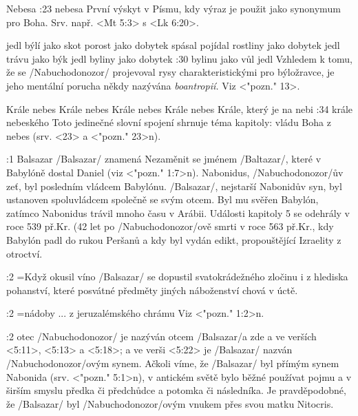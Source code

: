     {}   %
    {}   %
    {Nebesa}   %
    {}   %
    {}   %
:23 {nebesa}  První výskyt v Písmu, kdy výraz  je použit jako synonymum pro Boha. Srv. např.  <Mt 5:3> s <Lk 6:20>.

    {jedl býlí jako skot}   %
    {porost jako dobytek spásal}   %
    {pojídal rostliny jako dobytek}   %
    {jedl trávu jako býk}   %
    {jedl byliny jako dobytek}   %
:30 {bylinu jako vůl jedl}
     Vzhledem k tomu, že  se \x/Nabuchodonozor/ projevoval rysy charakteristickými pro býložravce, je jeho mentální porucha někdy nazývána {\em boantropií.} Viz <"pozn." 13>.

    {Krále nebes}   %
    {Krále nebes}   %
    {Krále nebes}   %
    {Krále nebes}   %
    {Krále, který je na nebi}   %
:34 {krále nebeského} Toto jedinečné slovní spojení shrnuje téma kapitoly: vládu Boha z nebes (srv. <23> a <"pozn." 23>n). 


:1 {Balsazar}
     \x/Balsazar/ znamená  
     Nezaměnit se jménem \x/Baltazar/, které v Babylóně dostal Daniel (viz <"pozn." 1:7>n). 
     Nabonidus, \x/Nabuchodonozor/ův zeť, byl posledním vládcem Babylónu. 
     \x/Balsazar/, nejstarší Nabonidův syn, byl ustanoven spoluvládcem společně se svým otcem.
     Byl mu svěřen Babylón, zatímco Nabonidus trávil mnoho času v Arábii.
     Události kapitoly 5 se odehrály v roce 539 př.Kr. (42 let po \x/Nabuchodonozor/ově
     smrti v roce 563 př.Kr., kdy Babylón padl do rukou Peršanů a kdy byl vydán
     edikt, propouštějící Izraelity z otroctví. 
     
     
:2 {}={Když okusil víno}  \x/Balsazar/ se dopustil svatokrádežného zločinu i z hlediska pohanství, které   posvátné předměty jiných náboženství chová v úctě.

:2 {}={nádoby ... z jeruzalémského chrámu} Viz  <"pozn." 1:2>n. 
     
:2 {otec}  \x/Nabuchodonozor/ je nazýván otcem \x/Balsazar/a zde a ve verších 
<5:11>, <5:13> a <5:18>; a ve verši <5:22> je \x/Balsazar/ nazván \x/Nabuchodonozor/ovým synem.
Ačkoli víme, že \x/Balsazar/ byl přímým synem Nabonida  (srv. <"pozn." 5:1>n), v antickém světě bylo běžné používat pojmu  a  v širším smyslu předka či předchůdce a potomka či následníka. Je pravděpodobné, že \x/Balsazar/ byl \x/Nabuchodonozor/ovým vnukem přes svou matku Nitocris.
     
